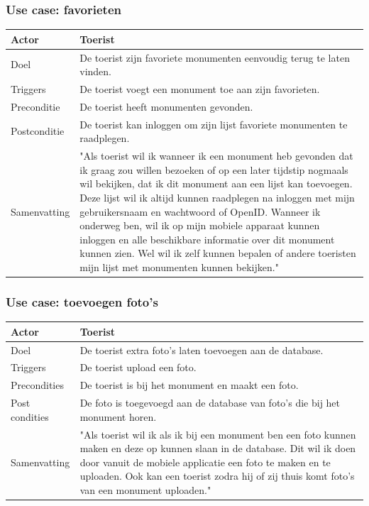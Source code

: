 \documentclass[a4paper,10pt]{article}
\newcommand{\rsubsubsection}[1]{
\subsubsection{#1}\label{sec:sub:sub:#1}
}
\newcommand\addrow[2]{#1 &#2\\ }
\newcommand\addheading[2]{#1 &#2\\ \hline}
\newcommand\tabularhead{\begin{tabular}{| lp{12cm} |}
\hline
}
\newenvironment{usecase}{\tabularhead}{\hline\end{tabular}}
\begin{document}
			\rsubsubsection{Use case: favorieten}
			\begin{usecase} 
			\addheading{Actor}{Toerist} 
			\addrow{Doel}{De toerist zijn favoriete monumenten eenvoudig terug te laten vinden.}
			\addrow{Triggers}{De toerist voegt een monument toe aan zijn favorieten.}
			\addrow{Preconditie}{De toerist heeft monumenten gevonden.}
			\addrow{Postconditie}{De toerist kan inloggen om zijn lijst favoriete monumenten te raadplegen.}
			\addrow{Samenvatting}{"Als toerist wil ik wanneer ik een monument heb gevonden dat ik graag zou willen bezoeken of op een later tijdstip nogmaals wil bekijken, dat ik dit monument aan een lijst kan toevoegen. Deze lijst wil ik altijd kunnen raadplegen na inloggen met mijn gebruikersnaam en wachtwoord of OpenID. Wanneer ik onderweg ben, wil ik op mijn mobiele apparaat kunnen inloggen en alle beschikbare informatie over dit monument kunnen zien. Wel wil ik zelf kunnen bepalen of andere toeristen mijn lijst met monumenten kunnen bekijken."}
			\end{usecase}	
			
			\rsubsubsection{Use case: toevoegen foto's}
			\begin{usecase}
			\addheading{Actor}{Toerist}
\addrow{Doel}{De toerist extra foto's laten toevoegen aan de database.}
\addrow{Triggers}{De toerist upload een foto.}
			\addrow{Precondities}{De toerist is bij het monument en maakt een foto.}
			\addrow{Post condities}{De foto is toegevoegd aan de database van foto's die bij het monument horen.}
			\addrow{Samenvatting}{"Als toerist wil ik als ik bij een monument ben een foto kunnen maken en deze op kunnen slaan in de database. Dit wil ik doen door vanuit de mobiele applicatie een foto te maken en te uploaden. Ook kan een toerist zodra hij of zij thuis komt foto's van een monument uploaden."}
			\end{usecase}
		
\end{document}
